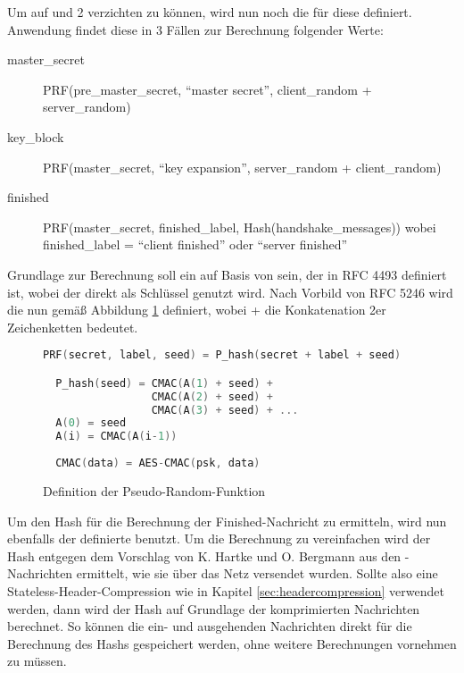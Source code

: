Um auf  und 2 verzichten zu können, wird nun noch die  für diese  definiert.
Anwendung findet diese in 3 Fällen zur Berechnung folgender Werte:
\begin{description}
  \item[master\_secret] PRF(pre\_master\_secret, "`master secret"', client\_random + server\_random)
  \item[key\_block] PRF(master\_secret, "`key expansion"', server\_random + client\_random)
  \item[finished] PRF(master\_secret, finished\_label, Hash(handshake\_messages)) \newline wobei finished\_label = "`client finished"' oder "`server finished"'
\end{description}
Grundlage zur Berechnung soll ein  auf Basis von  sein, der in RFC 4493 \cite{rfc4493} definiert ist, wobei der  direkt als Schlüssel genutzt wird.
Nach Vorbild von RFC 5246 \cite{rfc5246} wird die  nun gemäß Abbildung \ref{fig:def_psr} definiert, wobei + die Konkatenation 2er Zeichenketten bedeutet.
\begin{figure}[ht]
  \centering
  \begin{lstlisting}[language=c]
  PRF(secret, label, seed) = P_hash(secret + label + seed)

  P_hash(seed) = CMAC(A(1) + seed) +
                 CMAC(A(2) + seed) +
                 CMAC(A(3) + seed) + ...
  A(0) = seed
  A(i) = CMAC(A(i-1))
  
  CMAC(data) = AES-CMAC(psk, data)
  \end{lstlisting}
  \caption{Definition der Pseudo-Random-Funktion}
  \label{fig:def_psr}
\end{figure}

Um den Hash für die Berechnung der Finished-Nachricht zu ermitteln, wird nun ebenfalls der definierte  benutzt.
Um die Berechnung zu vereinfachen wird der Hash entgegen dem Vorschlag von K. Hartke und O. Bergmann \cite{draftcodtls} aus den
-Nachrichten ermittelt, wie sie über das Netz versendet wurden. Sollte also eine Stateless-Header-Compression wie in Kapitel
\ref{sec:headercompression} verwendet werden, dann wird der Hash auf Grundlage der komprimierten Nachrichten berechnet. So können
die ein- und ausgehenden Nachrichten direkt für die Berechnung des Hashs gespeichert werden, ohne weitere Berechnungen vornehmen zu müssen.
